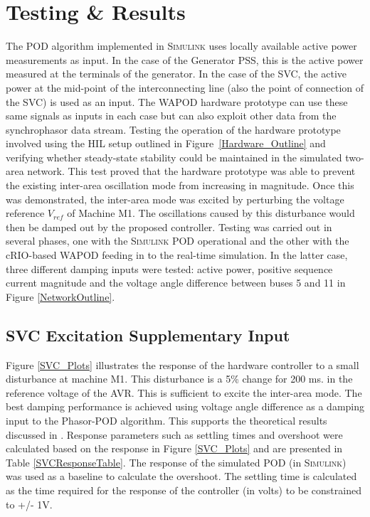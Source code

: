 \documentclass{ieeeaccess}
\begin{document}
\section{Testing \& Results}\label{Results}
The POD algorithm implemented in \textsc{Simulink} uses locally available active power measurements as input. In the case of the Generator PSS, this is the active power measured at the terminals of the generator. In the case of the SVC, the active power at the mid-point of the interconnecting line (also the point of connection of the SVC) is used as an input. The WAPOD hardware prototype can use these same signals as inputs in each case but can also exploit other data from the synchrophasor data stream. Testing the operation of the hardware prototype involved using the HIL setup outlined in Figure~\ref{Hardware_Outline} and verifying whether steady-state stability could be maintained in the simulated two-area network. This test proved that the hardware prototype was able to prevent the existing inter-area oscillation mode from increasing in magnitude. Once this was demonstrated, the inter-area mode was excited by perturbing the voltage reference $V_{ref}$ of Machine M1. The oscillations caused by this disturbance would then be damped out by the proposed controller. Testing was carried out in several phases, one with the \textsc{Simulink} POD operational and the other with the cRIO-based WAPOD feeding in to the real-time simulation. In the latter case, three different damping inputs were tested: active power, positive sequence current magnitude and the voltage angle difference between buses 5 and 11 in Figure \ref{NetworkOutline}.


\subsection{SVC Excitation Supplementary Input}
Figure \ref{SVC_Plots} illustrates the response of the hardware controller to a small disturbance at machine M1. This disturbance is a 5\% change for 200 ms. in the reference voltage of the AVR. This is sufficient to excite the inter-area mode. The best damping performance is achieved using voltage angle difference as a damping input to the Phasor-POD algorithm. This supports the theoretical results discussed in \cite{Yuwa}. Response parameters such as settling times and overshoot were calculated based on the response in Figure \ref{SVC_Plots} and are presented in Table \ref{SVCResponseTable}. The response of the simulated POD (in \textsc{Simulink}) was used as a baseline to calculate the overshoot. The settling time is calculated as the time required for the response of the controller (in volts) to be constrained to +/- 1V.
\end{document}
